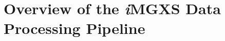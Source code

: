 %
%
%


\section{Overview of the \textit{i}MGXS Data Processing Pipeline}
\label{sec:chap10-overview}

